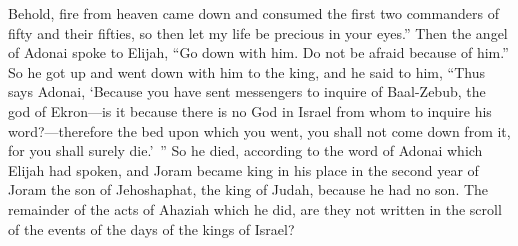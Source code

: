 \begin{biblechapter}
\verse Behold, fire from heaven came down and consumed the first two commanders of fifty and their fifties, so then let my life be precious in your eyes.”
\verse Then the angel of Adonai spoke to Elijah, “Go down with him. Do not be afraid because of him.” So he got up and went down with him to the king,
\verse and he said to him, “Thus says Adonai, ‘Because you have sent messengers to inquire of Baal-Zebub, the god of Ekron—is it because there is no God in Israel from whom to inquire his word?—therefore the bed upon which you went, you shall not come down from it, for you shall surely die.’ ”
 So he died, according to the word of Adonai which Elijah had spoken, and Joram became king in his place in the second year of Joram the son of Jehoshaphat, the king of Judah, because he had no son.
\verse The remainder of the acts of Ahaziah which he did, are they not written in the scroll of the events of the days of the kings of Israel?
\end{biblechapter}

